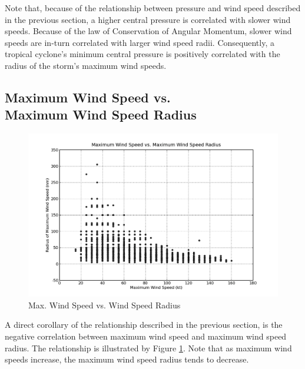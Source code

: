 \documentclass[letterpaper,twocolumn,10pt]{article}
\begin{document}
Note that, because of the relationship between pressure and wind speed described
in the previous section, a higher central pressure is correlated with slower
wind speeds. Because of the law of Conservation of Angular Momentum, slower wind
speeds are in-turn correlated with larger wind speed radii. Consequently, a
tropical cyclone's minimum central pressure is positively correlated with the
radius of the storm's maximum wind speeds.


\subsection{Maximum Wind Speed vs.\\Maximum Wind Speed Radius}
\begin{figure}[h!]
  \centering
  \includegraphics[scale=0.31]{speed_vs_radius.png}
  \caption{Max. Wind Speed vs. Wind Speed Radius}
  \label{speed_vs_radius}
\end{figure}
A direct corollary of the relationship described in the previous section, is the
negative correlation between maximum wind speed and maximum wind speed radius.
The relationship is illustrated by Figure \ref{speed_vs_radius}. Note that as
maximum wind speeds increase, the maximum wind speed radius tends to decrease.
\end{document}
